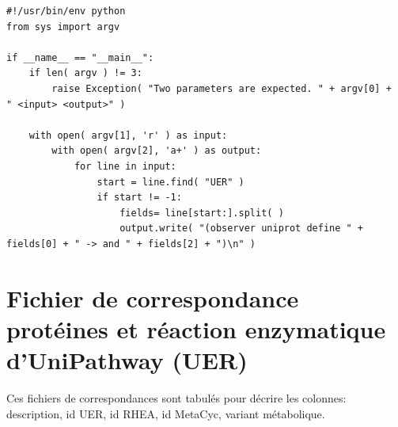 \begin{lstlisting}[style=python-style,caption=mappingUER\_Metacyc.py]
#!/usr/bin/env python
from sys import argv

if __name__ == "__main__":
    if len( argv ) != 3:
        raise Exception( "Two parameters are expected. " + argv[0] +  " <input> <output>" )
    
    with open( argv[1], 'r' ) as input:
        with open( argv[2], 'a+' ) as output:
            for line in input:
                start = line.find( "UER" )
                if start != -1:
                    fields= line[start:].split( )
                    output.write( "(observer uniprot define " + fields[0] + " -> and " + fields[2] + ")\n" )
\end{lstlisting}

\section{Fichier de correspondance protéines et réaction enzymatique d'UniPathway (UER)}

Ces fichiers de correspondances sont tabulés pour décrire les colonnes: description, id UER, id RHEA, id MetaCyc, variant métabolique.

